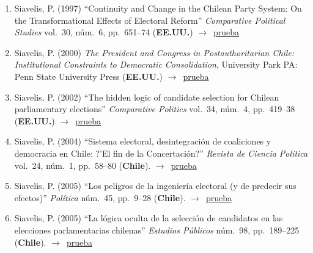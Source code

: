 \documentclass[12 pt, letter]{article}
\newenvironment{CitasMiTrabajo}{
    \begin{footnotesize}
    \begin{enumerate}[label={\footnotesize\emph{cita~\arabic*}},ref=\arabic*] %
        \setlength{\itemsep}{.1\itemsep}
        \setlength{\parskip}{.1\parskip}
    }{\end{enumerate}\end{footnotesize}}
\begin{document}
\begin{CitasMiTrabajo}
        \item Siavelis, P. (1997)
        ``Continuity and Change in the Chilean Party System: On the Transformational Effects of Electoral
        Reform''
        \emph{Comparative Political Studies} vol.\ 30, n\'um.\ 6, pp.\ 651--74
        (\textbf{EE.UU.}) $\rightarrow$~\href{https://github.com/emagar/cv/blob/master/citasMiTrab/mrs/siavelis97.pdf}{prueba}

        \item Siavelis, P. (2000) \emph{The President and Congress in
        Postauthoritarian Chile: Institutional Constraints to Democratic
        Consolidation}, University Park PA: Penn State University Press
        (\textbf{EE.UU.}) $\rightarrow$~\href{https://github.com/emagar/cv/blob/master/citasMiTrab/mrs/siavelisPdtCongPostAutChi.pdf}{prueba}

        \item Siavelis, P. (2002)
        ``The hidden logic of candidate selection
        for Chilean parliamentary elections'' \emph{Comparative Politics}
        vol.\ 34, n\'um.\ 4, pp.\ 419--38 (\textbf{EE.UU.}) $\rightarrow$~\href{https://github.com/emagar/cv/blob/master/citasMiTrab/mrs/siavels2002cp.pdf}{prueba}

        \item Siavelis, P. (2004)
        ``Sistema electoral, desintegraci\'on de coaliciones y democracia en Chile: ?'El fin de la Concertaci\'on?''
        \emph{Revista de Ciencia Pol\'itica} vol.\ 24, n\'um.\ 1, pp.\ 58--80  (\textbf{Chile}). $\rightarrow$~\href{https://github.com/emagar/cv/blob/master/citasMiTrab/mrs/siavelis2004rcp.pdf}{prueba}

        \item Siavelis, P. (2005)
        ``Los peligros de la ingenier\'ia electoral (y de predecir sus efectos)''
        \emph{Pol\'itica} n\'um.\ 45, pp.\ 9--28  (\textbf{Chile}). $\rightarrow$~\href{https://github.com/emagar/cv/blob/master/citasMiTrab/mrs/siavelis2005politica.pdf}{prueba}

        \item Siavelis, P. (2005)
        ``La l\'ogica oculta de la selecci\'on de candidatos en las elecciones parlamentarias chilenas''
            \emph{Estudios P\'ublicos}
        n\'um.\ 98, pp.\ 189--225 (\textbf{Chile}). $\rightarrow$~\href{https://github.com/emagar/cv/blob/master/citasMiTrab/mrs/Siavelis2005logicaoculta.pdf}{prueba}


\end{CitasMiTrabajo}
\end{document}
